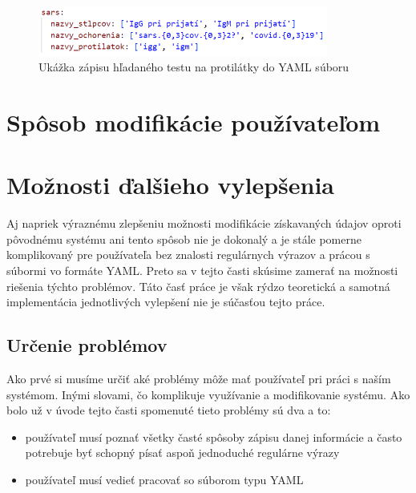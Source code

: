 \begin{figure}
	\centerline{\includegraphics[width=0.85\textwidth]{images/protilatky_yaml}}
	\caption[Ukážka zápisu testu na protilátky]{Ukážka zápisu hľadaného testu na protilátky do YAML súboru}
	\label{obr:protilatky_yaml}
\end{figure}

\section{Spôsob modifikácie používateľom}


\section{Možnosti ďalšieho vylepšenia}

Aj napriek výraznému zlepšeniu možnosti modifikácie získavaných údajov oproti pôvodnému systému ani tento spôsob nie je dokonalý a je stále pomerne komplikovaný pre používateľa bez znalosti regulárnych výrazov a prácou s súbormi vo formáte YAML. Preto sa v tejto časti skúsime zamerať na možnosti riešenia týchto problémov. Táto časť práce je však rýdzo teoretická a samotná implementácia jednotlivých vylepšení nie je súčasťou tejto práce. 

\subsection{Určenie problémov}

Ako prvé si musíme určiť aké problémy môže mať používateľ pri práci s naším systémom. Inými slovami, čo komplikuje využívanie a modifikovanie systému. Ako bolo už v úvode tejto časti spomenuté tieto problémy sú dva a to:

\begin{itemize}
	\item používateľ musí poznať všetky časté spôsoby zápisu danej informácie a často potrebuje byť schopný písať aspoň jednoduché regulárne výrazy
	\item používateľ musí vedieť pracovať so súborom typu YAML
\end{itemize}

